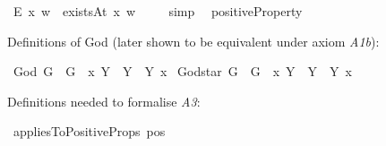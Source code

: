 \begin{isabellebody}
\ {\isachardoublequoteopen}E{\isacharbang}\ x\ w\ {\isasymlongleftrightarrow}\ existsAt\ x\ w{\isachardoublequoteclose}\ \isanewline
%
\isadelimproof
\ \ %
\endisadelimproof
%
\isatagproof
{}\isamarkupfalse%
\ simp\ %
%
\endisatagproof
{\isafoldproof}%
%
\isadelimproof
\isanewline
%
\endisadelimproof
\isanewline
{}\isamarkupfalse%
\ positiveProperty{\isacharcolon}{\isacharcolon}{\isachardoublequoteopen}{\isasymup}{\isasymlangle}{\isasymup}{\isasymlangle}{\isasymzero}{\isasymrangle}{\isasymrangle}{\isachardoublequoteclose}\ {\isacharparenleft}{\isachardoublequoteopen}{\isasymP}{\isachardoublequoteclose}{\isacharparenright}\ %
%
\begin{isamarkuptext}%
Definitions of God (later shown to be equivalent under axiom \emph{A1b}):%
\end{isamarkuptext}\isamarkuptrue%
\isamarkupfalse%
\ God{\isacharcolon}{\isacharcolon}{\isachardoublequoteopen}{\isasymup}{\isasymlangle}{\isasymzero}{\isasymrangle}{\isachardoublequoteclose}\ {\isacharparenleft}{\isachardoublequoteopen}G{\isachardoublequoteclose}{\isacharparenright}\ \ {\isachardoublequoteopen}G\ {\isasymequiv}\ {\isacharparenleft}{\isasymlambda}x{\isachardot}\ \isactrlbold {\isasymforall}Y{\isachardot}\ {\isasymP}\ Y\ \isactrlbold {\isasymrightarrow}\ Y\ x{\isacharparenright}{\isachardoublequoteclose}\isanewline
{}\isamarkupfalse%
\ God{\isacharunderscore}star{\isacharcolon}{\isacharcolon}{\isachardoublequoteopen}{\isasymup}{\isasymlangle}{\isasymzero}{\isasymrangle}{\isachardoublequoteclose}\ {\isacharparenleft}{\isachardoublequoteopen}G{\isacharasterisk}{\isachardoublequoteclose}{\isacharparenright}\ \ {\isachardoublequoteopen}G{\isacharasterisk}\ {\isasymequiv}\ {\isacharparenleft}{\isasymlambda}x{\isachardot}\ \isactrlbold {\isasymforall}Y{\isachardot}\ {\isasymP}\ Y\ \isactrlbold {\isasymleftrightarrow}\ Y\ x{\isacharparenright}{\isachardoublequoteclose}%
\begin{isamarkuptext}%
Definitions needed to formalise \emph{A3}:%
\end{isamarkuptext}\isamarkuptrue%
\isamarkupfalse%
\ appliesToPositiveProps{\isacharcolon}{\isacharcolon}{\isachardoublequoteopen}{\isasymup}{\isasymlangle}{\isasymup}{\isasymlangle}{\isasymup}{\isasymlangle}{\isasymzero}{\isasymrangle}{\isasymrangle}{\isasymrangle}{\isachardoublequoteclose}\ {\isacharparenleft}{\isachardoublequoteopen}pos{\isachardoublequoteclose}{\isacharparenright}\ \isanewline

\end{isabellebody}
